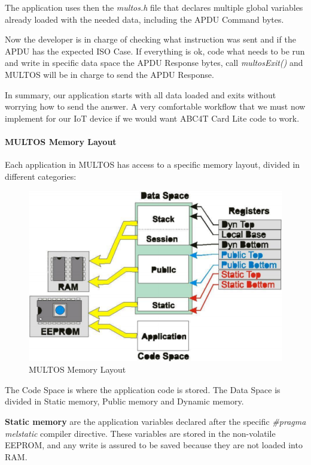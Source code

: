 The application uses then the \textit{multos.h} file that declares multiple global variables already loaded with the needed data, including the APDU Command bytes.

Now the developer is in charge of checking what instruction was sent and if the APDU has the expected ISO Case. If everything is ok, code what needs to be run and write in specific data space the APDU Response bytes, call \textit{multosExit()} and MULTOS will be in charge to send the APDU Response.

In summary, our application starts with all data loaded and exits without worrying how to send the answer. A very comfortable workflow that we must now implement for our IoT device if we would want ABC4T Card Lite code to work.

\paragraph{MULTOS Memory Layout}

Each application in MULTOS has access to a specific memory layout, divided in different categories:

\begin{figure}[bth]
	\begin{center}
		\includegraphics[width=0.8\linewidth]{gfx/multosMemLay}
	\end{center}
	\caption{MULTOS Memory Layout}
	\label{fig:multosMemLay}
\end{figure}


The Code Space is where the application code is stored.
The Data Space is divided in Static memory, Public memory and Dynamic memory.

\textbf{Static memory} are the application variables declared after the specific \textit{\#pragma melstatic} compiler directive. These variables are stored in the non-volatile EEPROM, and any write is assured to be saved because they are not loaded into RAM.


